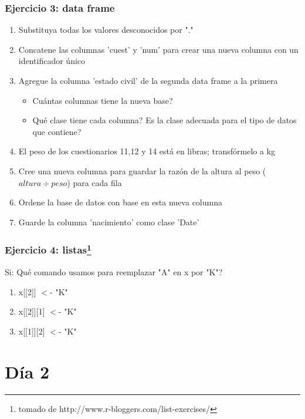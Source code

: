 \documentclass{beamer}
\begin{document}
\begin{frame}
 \frametitle{Ejercicio 3: data frame}
 \begin{enumerate}
 \item Substituya todas los valores desconocidos por "."
 \item Concatene las columnas 'cuest' y 'num' para crear una nueva columna con un identificador \'unico
 \item Agregue la columna 'estado civil' de la segunda data frame a la primera
  \begin{itemize}
	  \item Cu\'antas columnas tiene la nueva base?  
	  \item Qu\'e clase tiene cada columna? Es la clase adecuada para el tipo de datos que contiene?
  \end{itemize}
  \item El peso de los cuestionarios 11,12 y 14 est\'a en libras; transf\'ormelo a kg
  \item Cree una nueva columna para guardar la raz\'on de la altura al peso ($altura \div peso$) para cada fila
  \item Ordene la base de datos con base en esta nueva columna
  \item Guarde la columna 'nacimiento' como clase 'Date'
 \end{enumerate}
\end{frame}


\begin{frame}
 \frametitle{Ejercicio 4: listas\footnote{tomado de http://www.r-bloggers.com/list-exercises/}}
 Si:
\lst
Qu\'e comando usamos para reemplazar "A" en x por "K"?
\begin{enumerate}
 \item  x[[2]] $<$- "K" 
 \item  x[[2]][1] $<$- "K"
 \item  x[[1]][2] $<$- "K" 
\end{enumerate}
\end{frame}

\section{D\'ia 2}
\end{document}
